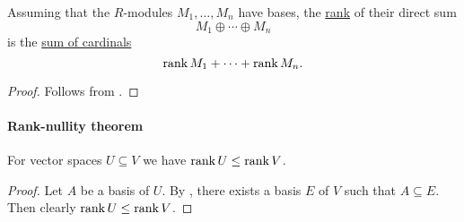 \begin{proposition}\label{thm:rank_of_direct_sum}
  Assuming that the \( R \)-modules \( M_1, \ldots, M_n \) have bases, the \hyperref[def:module_rank]{rank} of their direct sum
  \begin{equation*}
    M_1 \oplus \cdots \oplus M_n
  \end{equation*}
  is the \hyperref[def:cardinal_arithmetic/addition]{sum of cardinals}
  \begin{equation*}
    \operatorname{rank} M_1 + \cdots + \operatorname{rank} M_n.
  \end{equation*}
\end{proposition}
\begin{proof}
  Follows from .
\end{proof}

\paragraph{Rank-nullity theorem}

\begin{lemma}\label{thm:vector_space_dimension_monotonicity}
  For vector spaces \( U \subseteq V \) we have \( \operatorname{rank} U \leq \operatorname{rank} V \).
\end{lemma}
\begin{proof}
  Let \( A \) be a basis of \( U \). By , there exists a basis \( E \) of \( V \) such that \( A \subseteq E \). Then clearly \( \operatorname{rank} U \leq \operatorname{rank} V \).
\end{proof}

